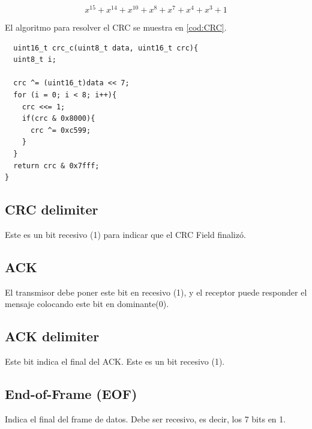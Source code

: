 $$x^{15} + x^{14} + x^{10} + x^{8} + x^7 + x^4 + x^3 + 1$$

El algoritmo para resolver el CRC se muestra en \ref{cod:CRC}.

\begin{lstlisting}
  uint16_t crc_c(uint8_t data, uint16_t crc){
  uint8_t i;

  crc ^= (uint16_t)data << 7;
  for (i = 0; i < 8; i++){
    crc <<= 1;
    if(crc & 0x8000){
      crc ^= 0xc599;
    }
  }
  return crc & 0x7fff;
}
\end{lstlisting}

\subsection{ CRC delimiter}
Este es un bit recesivo (1) para indicar que el CRC Field finalizó.

\subsection{ ACK}
El transmisor debe poner este bit en recesivo (1), y el receptor puede responder
el mensaje colocando este bit en dominante(0).

\subsection{ ACK delimiter}
Este bit indica el final del ACK. Este es un bit recesivo (1).

\subsection{ End-of-Frame (EOF)}
Indica el final del frame de datos. Debe ser recesivo, es decir, los 7 bits en
1.
